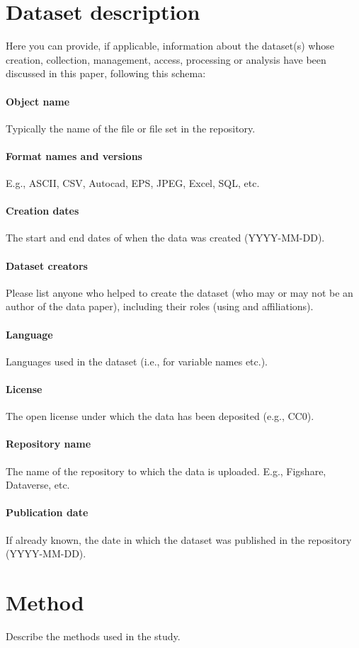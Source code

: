 \documentclass{article}
\begin{document}
\section{Dataset description}
Here you can provide, if applicable, information about the dataset(s) whose creation, collection, management, access, processing or analysis have been discussed in this paper, following this schema:
\paragraph{Object name} Typically the name of the file or file set in the repository.
\paragraph{Format names and versions} E.g., ASCII, CSV, Autocad, EPS, JPEG, Excel, SQL, etc.
\paragraph{Creation dates} The start and end dates of when the data was created (YYYY-MM-DD).
\paragraph{Dataset creators} Please list anyone who helped to create the dataset (who may or may not be an author of the data paper), including their roles (using and affiliations).
\paragraph{Language} Languages used in the dataset (i.e., for variable names etc.).
\paragraph{License} The open license under which the data has been deposited (e.g., CC0). 
\paragraph{Repository name} The name of the repository to which the data is uploaded. E.g., Figshare, Dataverse, etc. 
\paragraph{Publication date} If already known, the date in which the dataset was published in the repository (YYYY-MM-DD).

\section{Method}
Describe the methods used in the study.
\end{document}
